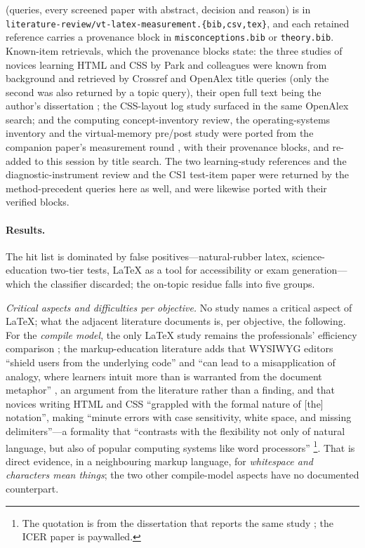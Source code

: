 (queries, every screened paper with abstract, decision and reason) is in
\texttt{literature-review/vt-latex-measurement.\{bib,csv,tex\}}, and each
retained reference carries a provenance block in
\texttt{misconceptions.bib} or \texttt{theory.bib}.
Known-item retrievals, which the provenance blocks state: the three
studies of novices learning HTML and CSS by Park and colleagues
\autocite{Park2011WebDev,Park2013ErrorTaxonomy,Park2015SyntaxErrors} were
known from background and retrieved by Crossref and OpenAlex title
queries (only the second was also returned by a topic query), their open
full text being the author's dissertation \autocite{Park2014openHTML};
the CSS-layout log study \autocite{Kim2019CSSLayout} surfaced in the same
OpenAlex search; and the computing concept-inventory review, the
operating-systems inventory and the virtual-memory pre/post study
\autocite{Taylor2014CI,WebbTaylor2014OSCI,Pamplona2024VirtualMemory} were
ported from the companion paper's measurement round
\autocite{VTTerminal}, with their provenance blocks, and re-added to this
session by title search.
The two learning-study references and the diagnostic-instrument review
\autocite{PangMarton2005,Kullberg2017ZDM,KaltakciGurel2015Diagnostics} and
the CS1 test-item paper \autocite{Vahrenhold2014TestItems} were returned
by the method-precedent queries here as well, and were likewise ported
with their verified blocks.

\paragraph{Results.}
The hit list is dominated by false positives---natural-rubber latex,
science-education two-tier tests, LaTeX as a tool for accessibility or
exam generation---which the classifier discarded; the on-topic residue
falls into five groups.

\emph{Critical aspects and difficulties per objective.}
No study names a critical aspect of LaTeX; what the adjacent literature
documents is, per objective, the following.
For the \emph{compile model}, the only LaTeX study remains the
professionals' efficiency comparison \autocite{Knauff2014Latex}; the
markup-education literature adds that WYSIWYG editors \enquote{shield
users from the underlying code} and \enquote{can lead to a misapplication
of analogy, where learners intuit more than is warranted from the
document metaphor} \autocite[p.~38]{Park2014openHTML}, an argument from
the literature rather than a finding, and that novices writing HTML and
CSS \enquote{grappled with the formal nature of [the] notation},
making \enquote{minute errors with case sensitivity, white space, and
missing delimiters}---a formality that \enquote{contrasts with the
flexibility not only of natural language, but also of popular computing
systems like word processors} \autocite{Park2011WebDev}\footnote{The
quotation is from the dissertation that reports the same study
\autocite[p.~61]{Park2014openHTML}; the ICER paper is paywalled.}.
That is direct evidence, in a neighbouring markup language, for
\emph{whitespace and characters mean things}; the two other compile-model
aspects have no documented counterpart.

